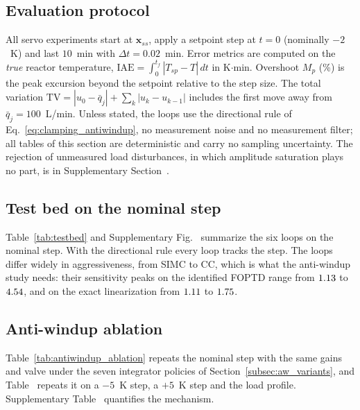 
\subsection{Evaluation protocol}
\label{subsec:protocol}
All servo experiments start at $\mathbf{x}_{ss}$, apply a setpoint step at $t = 0$ (nominally $-2$~K) and last $10$~min with $\Delta t = 0.02$~min. Error metrics are computed on the \emph{true} reactor temperature, $\mathrm{IAE} = \int_0^{t_f}|T_{sp} - T|\,dt$ in K$\cdot$min. Overshoot $M_p$ (\%) is the peak excursion beyond the setpoint relative to the step size. The total variation $\mathrm{TV} = |u_0 - \bar q_j| + \sum_k |u_k - u_{k-1}|$ includes the first move away from $\bar q_j = 100$~L/min. Unless stated, the loops use the directional rule of Eq.~\eqref{eq:clamping_antiwindup}, no measurement noise and no measurement filter; all tables of this section are deterministic and carry no sampling uncertainty. The rejection of unmeasured load disturbances, in which amplitude saturation plays no part, is in Supplementary Section~.

\subsection{Test bed on the nominal step}
Table~\ref{tab:testbed} and Supplementary Fig.~ summarize the six loops on the nominal step. With the directional rule every loop tracks the step. The loops differ widely in aggressiveness, from SIMC to CC, which is what the anti-windup study needs: their sensitivity peaks on the identified FOPTD range from $1.13$ to $4.54$, and on the exact linearization from $1.11$ to $1.75$.





\subsection{Anti-windup ablation}
\label{subsec:ablation}
Table~\ref{tab:antiwindup_ablation} repeats the nominal step with the same gains and valve under the seven integrator policies of Section~\ref{subsec:aw_variants}, and Table~ repeats it on a $-5$~K step, a $+5$~K step and the load profile. Supplementary Table~ quantifies the mechanism.

